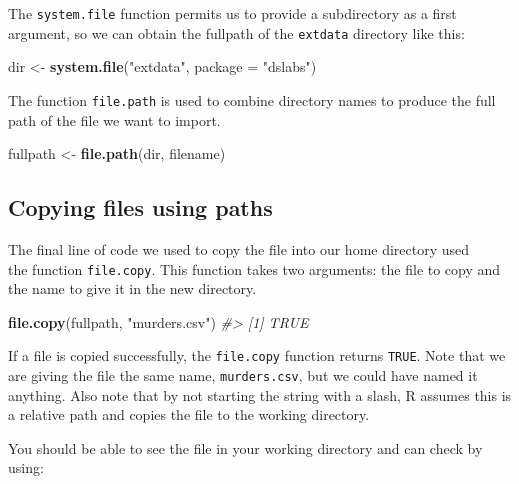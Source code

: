 \documentclass[
]{krantz}
\newenvironment{Shaded}{\begin{snugshade}}{\end{snugshade}}
\newcommand{\CommentTok}[1]{\textcolor[rgb]{0.37,0.37,0.37}{\textit{#1}}}
\newcommand{\DataTypeTok}[1]{\textcolor[rgb]{0.27,0.27,0.27}{#1}}
\newcommand{\KeywordTok}[1]{\textcolor[rgb]{0.27,0.27,0.27}{\textbf{#1}}}
\newcommand{\NormalTok}[1]{#1}
\newcommand{\StringTok}[1]{\textcolor[rgb]{0.5,0.5,0.5}{#1}}
\begin{document}
The \texttt{system.file} function permits us to provide a subdirectory as a first argument, so we can obtain the fullpath of the \texttt{extdata} directory like this:

\begin{Shaded}
\begin{Highlighting}[]
\NormalTok{dir <-}\StringTok{ }\KeywordTok{system.file}\NormalTok{(}\StringTok{"extdata"}\NormalTok{, }\DataTypeTok{package =} \StringTok{"dslabs"}\NormalTok{) }
\end{Highlighting}
\end{Shaded}

The function \texttt{file.path} is used to combine directory names to produce the full path of the file we want to import.

\begin{Shaded}
\begin{Highlighting}[]
\NormalTok{fullpath <-}\StringTok{ }\KeywordTok{file.path}\NormalTok{(dir, filename)}
\end{Highlighting}
\end{Shaded}

\hypertarget{copying-files-using-paths}{%
\subsection{Copying files using paths}\label{copying-files-using-paths}}

The final line of code we used to copy the file into our home directory used\\
the function \texttt{file.copy}. This function takes two arguments: the file to copy and the name to give it in the new directory.

\begin{Shaded}
\begin{Highlighting}[]
\KeywordTok{file.copy}\NormalTok{(fullpath, }\StringTok{"murders.csv"}\NormalTok{)}
\CommentTok{#> [1] TRUE}
\end{Highlighting}
\end{Shaded}

If a file is copied successfully, the \texttt{file.copy} function returns \texttt{TRUE}. Note that we are giving the file the same name, \texttt{murders.csv}, but we could have named it anything. Also note that by not starting the string with a slash, R assumes this is a relative path and copies the file to the working directory.

You should be able to see the file in your working directory and can check by using:
\end{document}
